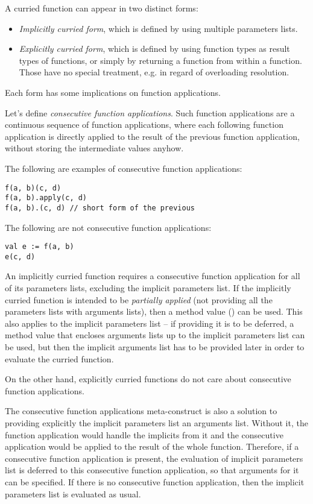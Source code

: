 A curried function can appear in two distinct forms:
\begin{itemize}
  \item[] {\em Implicitly curried form}, which is defined by using multiple parameters lists. 
  \item[] {\em Explicitly curried form}, which is defined by using function types as result types of functions, or simply by returning a function from within a function. Those have no special treatment, e.g. in regard of overloading resolution. 
\end{itemize}

Each form has some implications on function applications. 

Let's define {\em consecutive function applications}. Such function applications are a continuous sequence of function applications, where each following function application is directly applied to the result of the previous function application, without storing the intermediate values anyhow. 

\example The following are examples of consecutive function applications:
\begin{lstlisting}
f(a, b)(c, d)
f(a, b).apply(c, d)
f(a, b).(c, d) // short form of the previous
\end{lstlisting}
The following are not consecutive function applications:
\begin{lstlisting}
val e := f(a, b)
e(c, d)
\end{lstlisting}

An implicitly curried function requires a consecutive function application for all of its parameters lists, excluding the implicit parameters list. If the implicitly curried function is intended to be {\em partially applied} (not providing all the parameters lists with arguments lists), then a method value () can be used. This also applies to the implicit parameters list -- if providing it is to be deferred, a method value that encloses arguments lists up to the implicit parameters list can be used, but then the implicit arguments list has to be provided later in order to evaluate the curried function. 

On the other hand, explicitly curried functions do not care about consecutive function applications. 

The consecutive function applications meta-construct is also a solution to providing explicitly the implicit parameters list an arguments list. Without it, the function application would handle the implicits from it and the consecutive application would be applied to the result of the whole function. Therefore, if a consecutive function application is present, the evaluation of implicit parameters list is deferred to this consecutive function application, so that arguments for it can be specified. If there is no consecutive function application, then the implicit parameters list is evaluated as usual. 





